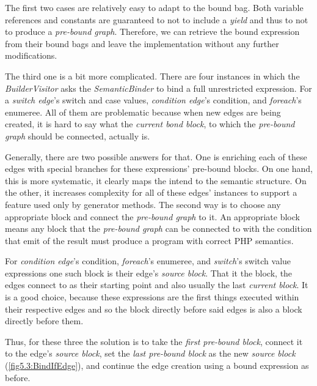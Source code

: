 The first two cases are relatively easy to adapt to the bound bag. Both variable references and constants are guaranteed to not to include a \emph{yield} and thus to not to produce a \emph{pre-bound graph}. Therefore, we can retrieve the bound expression from their bound bags and leave the implementation without any further modifications.

The third one is a bit more complicated. There are four instances in which the \emph{BuilderVisitor} asks the \emph{SemanticBinder} to bind a full unrestricted expression. For a \emph{switch edge}’s switch and case values, \emph{condition edge}’s condition, and \emph{foreach}’s enumeree. All of them are problematic because when new edges are being created, it is hard to say what the \emph{current bond block}, to which the \emph{pre-bound graph} should be connected, actually is.

Generally, there are two possible answers for that. One is enriching each of these edges with special branches for these expressions’ pre-bound blocks. On one hand, this is more systematic, it clearly maps the intend to the semantic structure. On the other, it increases complexity for all of these edges’ instances to support a feature used only by generator methods. The second way is to choose any appropriate block and connect the \emph{pre-bound graph} to it. An appropriate block means any block that the \emph{pre-bound graph} can be connected to with the condition that emit of the result must produce a program with correct PHP semantics.

For \emph{condition edge}’s condition, \emph{foreach}’s enumeree, and \emph{switch}’s switch value expressions one such block is their edge’s \emph{source block}. That it the block, the edges connect to as their starting point and also usually the last \emph{current block}. It is a good choice, because these expressions are the first things executed within their respective edges and so the block directly before said edges is also a block directly before them.

Thus, for these three the solution is to take the \emph{first pre-bound block}, connect it to the edge’s \emph{source block}, set the \emph{last pre-bound block} as the new \emph{source block} (\autoref{fig5.3:BindIfEdge}), and continue the edge creation using a bound expression as before.

